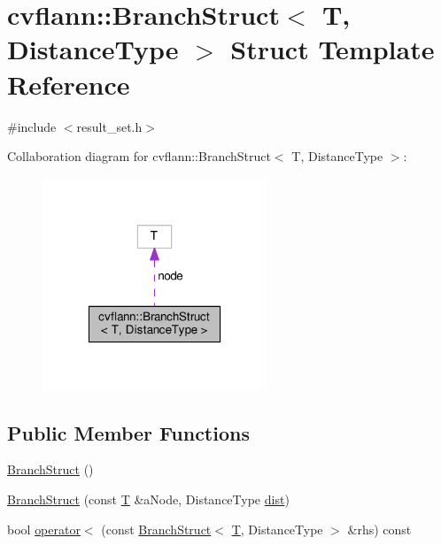 \hypertarget{structcvflann_1_1BranchStruct}{\section{cvflann\-:\-:Branch\-Struct$<$ T, Distance\-Type $>$ Struct Template Reference}
\label{structcvflann_1_1BranchStruct}
}


{\ttfamily \#include $<$result\-\_\-set.\-h$>$}



Collaboration diagram for cvflann\-:\-:Branch\-Struct$<$ T, Distance\-Type $>$\-:\nopagebreak
\begin{figure}[H]
\begin{center}
\leavevmode
\includegraphics[width=190pt]{structcvflann_1_1BranchStruct__coll__graph}
\end{center}
\end{figure}
\subsection*{Public Member Functions}
\begin{DoxyCompactItemize}
\item 
\hyperlink{structcvflann_1_1BranchStruct_ab4ea7c79845c3c87cb499c6add189fbc}{Branch\-Struct} ()
\item 
\hyperlink{structcvflann_1_1BranchStruct_a891470032d94f27f252a1b5d582f724c}{Branch\-Struct} (const \hyperlink{calib3d_8hpp_a3efb9551a871ddd0463079a808916717}{T} \&a\-Node, Distance\-Type \hyperlink{legacy_8hpp_ae895c2003a87eda49126845b7ac3688e}{dist})
\item 
bool \hyperlink{structcvflann_1_1BranchStruct_a388b1ce9dd1676fea8fdf916031e8551}{operator$<$} (const \hyperlink{structcvflann_1_1BranchStruct}{Branch\-Struct}$<$ \hyperlink{calib3d_8hpp_a3efb9551a871ddd0463079a808916717}{T}, Distance\-Type $>$ \&rhs) const 
\end{DoxyCompactItemize}
